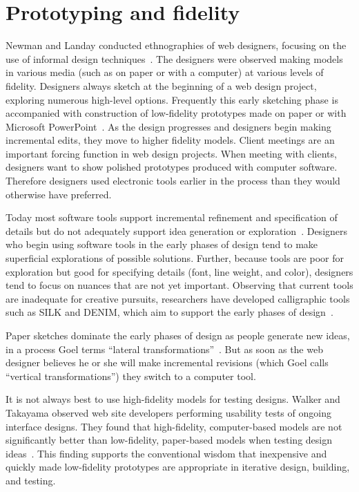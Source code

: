 \section{Prototyping and fidelity}
\label{sec:traditional-prototyping}

Newman and Landay conducted ethnographies of web designers, focusing
on the use of informal design
techniques~\cite{newman-web-designers}. The designers were observed
making models in various media (such as on paper or with a computer)
at various levels of fidelity. Designers always sketch at the
beginning of a web design project, exploring numerous high-level
options. Frequently this early sketching phase is accompanied with
construction of low-fidelity prototypes made on paper or with
Microsoft
PowerPoint\texttrademark~\cite{arnowitz-software-prototyping}. As the
design progresses and designers begin making incremental edits, they
move to higher fidelity models. Client meetings are an important
forcing function in web design projects. When meeting with clients,
designers want to show polished prototypes produced with computer
software. Therefore designers used electronic tools earlier in the
process than they would otherwise have preferred.

Today most software tools support incremental refinement and
specification of details but do not adequately support idea generation
or exploration~\cite{terry-creative-ui}. Designers who begin using
software tools in the early phases of design tend to make superficial
explorations of possible solutions. Further, because tools are poor
for exploration but good for specifying details (font, line weight,
and color), designers tend to focus on nuances that are not yet
important. Observing that current tools are inadequate for creative
pursuits, researchers have developed calligraphic tools such as SILK
and DENIM, which aim to support the early phases of
design~\cite{landay-silk,lin-denim}.

Paper sketches dominate the early phases of design as people generate
new ideas, in a process Goel terms ``lateral
transformations''~\cite{goel-sketches-of-thought}. But as soon as the
web designer believes he or she will make incremental revisions (which
Goel calls ``vertical transformations'') they switch to a computer
tool.

It is not always best to use high-fidelity models for testing
designs. Walker and Takayama observed web site developers performing
usability tests of ongoing interface designs. They found that
high-fidelity, computer-based models are not significantly better than
low-fidelity, paper-based models when testing design
ideas~\cite{walker-fidelity}. This finding supports the conventional
wisdom that inexpensive and quickly made low-fidelity prototypes are
appropriate in iterative design, building, and testing.

